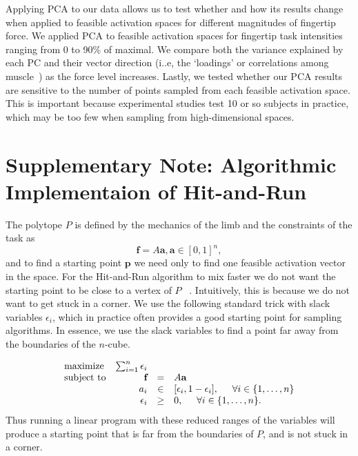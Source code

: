 \documentclass[letterpaper]{article}
\begin{document}
Applying PCA to our data allows us to test whether and how its results change when applied to feasible activation spaces for different magnitudes of fingertip force. We applied PCA to feasible activation spaces for fingertip task intensities ranging from 0 to 90\% of maximal.
We compare both the variance explained by each PC and their vector direction (i..e, the `loadings' or correlations among muscle~\cite{valero2016robot}) as the force level increases.
Lastly, we tested whether our PCA results are sensitive to the number of points sampled from each feasible activation space. This is important because experimental studies test 10 or so subjects in practice, which may be too few when sampling from high-dimensional spaces.


\section*{Supplementary Note: Algorithmic Implementaion of Hit-and-Run}
The polytope $P$ is defined by the mechanics of the limb and the constraints of the task as
\[\textbf{f} = A\textbf{a}, \textbf{a} \in [0,1]^n,\]
and to find a starting point $\textbf{p}$ we need only to find one feasible activation vector in the space.
For the Hit-and-Run algorithm to mix faster we do not want the starting point to be close to a vertex of $P$ ~\cite{Lovasz}. Intuitively, this is because we do not want to get stuck in a corner.
We use the following standard trick with slack variables $\epsilon_i$, which in practice often provides a good starting point for sampling algorithms. In essence, we use the slack variables to find a point far away from the boundaries of the $n$-cube.

\begin{equation}\label{eq:LP_r}
\begin{array}{lrcl}
\mbox{maximize} & \sum_{i=1}^n \epsilon_i \\
\mbox{subject to} & \textbf{f} &=& A\textbf{a}\\
 & a_i &\in& [\epsilon_i, 1- \epsilon_i], \hspace{5mm} \forall i \in \{1,\dots,n\} \\
 & \epsilon_i &\geq& 0, \hspace{5mm} \forall i \in \{1,\dots,n\}.
\end{array}
\end{equation}
Thus running a linear program with these reduced ranges of the variables will produce a starting point that is far from the boundaries of $P$, and is not stuck in a corner.
\end{document}
